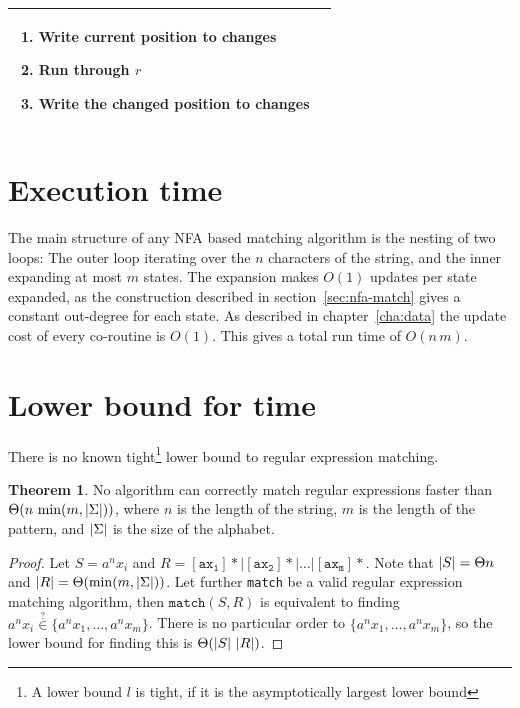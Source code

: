 \documentclass[11pt,a4paper,twoside,openright]{Thesis}
\theoremstyle{definition}
\newtheorem{thm}{Theorem}
\newcommand{\seclabel}[1]{\label{sec:#1}}
\begin{document}
\begin{center}
\begin{tabular}{p{5cm}|p{7cm}}
    \begin{enumerate}
      \item Write current position to changes
      \item Run through $r$
      \item Write the changed position to changes
    \end{enumerate} \\
    \hline \hline
  \end{tabular}
\end{center}

\section{Execution time}
The main structure of any NFA based matching algorithm is the nesting of two
loops: The outer loop iterating over the $n$ characters of the string, and
the inner expanding at most $m$ states. The expansion makes $O(1)$ updates
per state expanded, as the construction described in
section~\ref{sec:nfa-match} gives a constant out-degree for each state. As
described in chapter~\ref{cha:data} the update cost of every co-routine is
$O(1)$. This gives a total run time of $O(n\, m)$.

\section{Lower bound for time}\seclabel{lower-bound}
There is no known tight\footnote{A lower bound $l$ is tight, if it is the
asymptotically largest lower bound} lower bound to regular expression
matching.

\begin{thm}
  No algorithm can correctly match regular expressions faster than
  $\Theta(n\, \min(m, \left|\Sigma\right|))$, where $n$ is the length of the string,
  $m$ is the length of the pattern, and $\left|\Sigma\right|$ is the size of the alphabet.
\end{thm}
\begin{proof}
  Let $S=a^nx_i$ and $R=\mathtt{[ax_1]*|[ax_2]*|\dots|[ax_m]*}$. Note that
  $\left|S\right| = \Theta{n}$ and $\left|R\right|=\Theta(\min(m, \left|\Sigma\right|))$. Let
  further \texttt{match} be a valid regular expression matching algorithm,
  then $\mathtt{match}(S, R)$ is equivalent to finding
  $a^nx_i\stackrel{?}{\in} \{a^nx_1, \dots, a^nx_m\}$. There is no particular order to
  $\{a^nx_1, \dots, a^nx_m\}$, so the lower bound for finding this is
  $\Theta(\left|S\right|\, \left|R\right|)$.
\end{proof}
\end{document}

